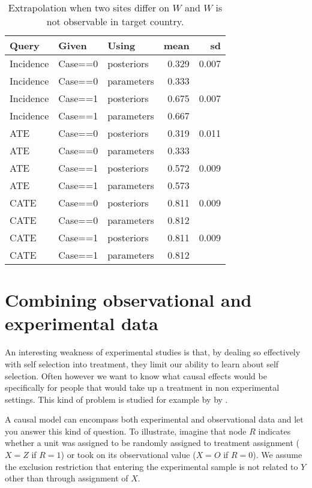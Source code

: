 \documentclass[
  12pt,
]{book}
\begin{document}
\begin{table}

\caption{\label{tab:unnamed-chunk-111}Extrapolation when two sites differ on $W$ and $W$ is not observable in target country.}
\centering
\begin{tabular}[t]{l|l|l|r|r}
\hline
Query & Given & Using & mean & sd\\
\hline
Incidence & Case==0 & posteriors & 0.329 & 0.007\\
\hline
Incidence & Case==0 & parameters & 0.333 & \\
\hline
Incidence & Case==1 & posteriors & 0.675 & 0.007\\
\hline
Incidence & Case==1 & parameters & 0.667 & \\
\hline
ATE & Case==0 & posteriors & 0.319 & 0.011\\
\hline
ATE & Case==0 & parameters & 0.333 & \\
\hline
ATE & Case==1 & posteriors & 0.572 & 0.009\\
\hline
ATE & Case==1 & parameters & 0.573 & \\
\hline
CATE & Case==0 & posteriors & 0.811 & 0.009\\
\hline
CATE & Case==0 & parameters & 0.812 & \\
\hline
CATE & Case==1 & posteriors & 0.811 & 0.009\\
\hline
CATE & Case==1 & parameters & 0.812 & \\
\hline
\end{tabular}
\end{table}

\hypertarget{combining-observational-and-experimental-data}{%
\section{Combining observational and experimental data}\label{combining-observational-and-experimental-data}}

An interesting weakness of experimental studies is that, by dealing so effectively with self selection into treatment, they limit our ability to learn about self selection. Often however we want to know what causal effects would be specifically for people that would take up a treatment in non experimental settings. This kind of problem is studied for example by by \citet{knox2019design}.

A causal model can encompass both experimental and observational data and let you answer this kind of question. To illustrate, imagine that node \(R\) indicates whether a unit was assigned to be randomly assigned to treatment assignment (\(X=Z\) if \(R=1\)) or took on its observational value (\(X=O\) if \(R=0\)). We assume the exclusion restriction that entering the experimental sample is not related to \(Y\) other than through assignment of \(X\).
\end{document}
